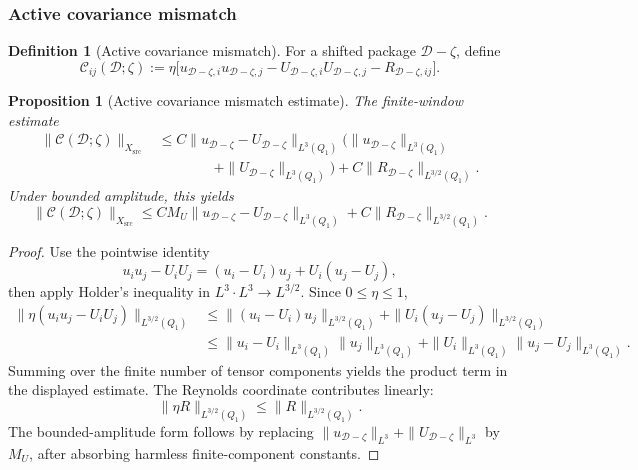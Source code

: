 \documentclass[11pt]{article}
\numberwithin{equation}{section}
\newtheorem{proposition}[proposition]{Proposition}
\theoremstyle{definition}
\newtheorem{definition}[definition]{Definition}
\theoremstyle{remark}
\newcommand{\src}{\mathrm{src}}
\newcommand{\calD}{\mathcal D}
\newcommand{\Xsrc}{X_{\src}}
\newcommand{\Qone}{Q_1}
\begin{document}
\subsubsection{Active covariance mismatch}

\begin{definition}[Active covariance mismatch]
\label{ps:def:active-covariance-mismatch}
For a shifted package \(\calD-\zeta\), define
\[
    \mathcal C_{ij}(\calD;\zeta)
    :=
    \eta\bigl[
        u_{\calD-\zeta,i}u_{\calD-\zeta,j}
        -
        U_{\calD-\zeta,i}U_{\calD-\zeta,j}
        -
        R_{\calD-\zeta,ij}
    \bigr].
\]
\end{definition}

\begin{proposition}[Active covariance mismatch estimate]
\label{ps:prop:active-covariance-target}
The finite-window estimate
\[
\begin{aligned}
    \|\mathcal C(\calD;\zeta)\|_{\Xsrc}
    &\le
    C
    \|u_{\calD-\zeta}-U_{\calD-\zeta}\|_{L^3(\Qone)}
    \bigl(
        \|u_{\calD-\zeta}\|_{L^3(\Qone)}
\\
    &\qquad\qquad
        +
        \|U_{\calD-\zeta}\|_{L^3(\Qone)}
    \bigr)
    +
    C\|R_{\calD-\zeta}\|_{L^{3/2}(\Qone)}.
\end{aligned}
\]
Under bounded amplitude, this yields
\[
    \|\mathcal C(\calD;\zeta)\|_{\Xsrc}
    \le
    C M_U
    \|u_{\calD-\zeta}-U_{\calD-\zeta}\|_{L^3(\Qone)}
    +
    C\|R_{\calD-\zeta}\|_{L^{3/2}(\Qone)}.
\]
\end{proposition}

\begin{proof}
Use the pointwise identity
\[
    u_i u_j-U_iU_j
    =
    (u_i-U_i)u_j+U_i(u_j-U_j),
\]
then apply Holder's inequality in \(L^3\cdot L^3\to L^{3/2}\).  Since
\(0\le \eta\le1\),
\[
\begin{aligned}
    \|\eta(u_i u_j-U_iU_j)\|_{L^{3/2}(\Qone)}
    &\le
    \|(u_i-U_i)u_j\|_{L^{3/2}(\Qone)}
    +
    \|U_i(u_j-U_j)\|_{L^{3/2}(\Qone)}       \\
    &\le
    \|u_i-U_i\|_{L^3(\Qone)}\|u_j\|_{L^3(\Qone)}
    +
    \|U_i\|_{L^3(\Qone)}\|u_j-U_j\|_{L^3(\Qone)} .
\end{aligned}
\]
Summing over the finite number of tensor components yields the product term in
the displayed estimate.  The Reynolds coordinate contributes linearly:
\[
    \|\eta R\|_{L^{3/2}(\Qone)}
    \le
    \|R\|_{L^{3/2}(\Qone)}.
\]
The bounded-amplitude form follows by replacing
\(\|u_{\calD-\zeta}\|_{L^3}+\|U_{\calD-\zeta}\|_{L^3}\) by \(M_U\), after
absorbing harmless finite-component constants.
\end{proof}
\end{document}
